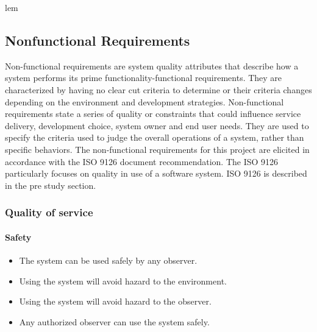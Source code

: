 lem\subsection{Nonfunctional Requirements}
Non-functional requirements are system quality attributes that describe how a system performs its prime functionality-functional requirements. They are characterized by having no clear cut criteria to determine or their criteria changes depending on the environment and development strategies. Non-functional requirements state a series of quality or constraints that could influence service delivery, development choice, system owner and end user needs. They are used to specify the criteria used to judge the overall operations of a system, rather than specific behaviors.  The non-functional requirements for this project are elicited in accordance with the ISO 9126 document recommendation. The ISO 9126 particularly focuses on quality in use of a software system. ISO 9126 is described in the pre study section.
\\[0.4cm]

\subsubsection{Quality of service}
	\paragraph{Safety}

	\begin{itemize}
		\item The system can be used safely by any observer.
        \item Using the system will avoid hazard to the environment.
        \item Using the system will avoid hazard to the observer.
        \item Any authorized observer can use the system safely.
	\end{itemize}
